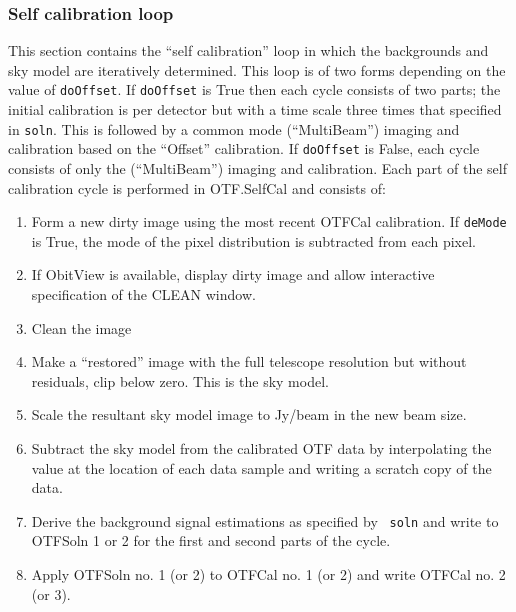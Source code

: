 \documentclass[11pt]{report}
\begin{document}
\subsubsection{Self calibration loop}
This section contains the ``self calibration'' loop in which the
backgrounds and sky model are iteratively determined.
This loop is of two forms depending on the value of {\tt doOffset}.
If {\tt doOffset} is True then each cycle consists of two parts; the
initial calibration is per detector but with a time scale three times that
specified in {\tt soln}.
This is followed by a common mode (``MultiBeam'') imaging and
calibration based on the ``Offset'' calibration.
If {\tt doOffset} is False, each cycle consists of only the
(``MultiBeam'') imaging and calibration.
Each part of the self calibration cycle is performed in OTF.SelfCal
and consists of: 
\begin{enumerate}
\item Form a new dirty image using the most recent OTFCal
calibration.
If {\tt deMode} is True,  the mode of the pixel distribution is
subtracted from each pixel.
\item If ObitView is available, display dirty image and allow
interactive specification of the CLEAN window.
\item Clean the image
\item Make a ``restored'' image with the full telescope resolution but
without residuals, clip below zero.
This is the sky model.
\item Scale the resultant sky model image to Jy/beam in the new beam size.
\item Subtract the sky model from the calibrated OTF data by
interpolating the value at the location of each data sample and
writing a scratch copy of the data.
\item Derive the background signal estimations as specified by {\tt
soln} and write to OTFSoln 1 or 2 for the first and second parts of
  the cycle.
\item  Apply OTFSoln no. 1 (or 2) to OTFCal no. 1 (or 2) and write
  OTFCal no. 2 (or 3).
\end{enumerate}
\end{document}
